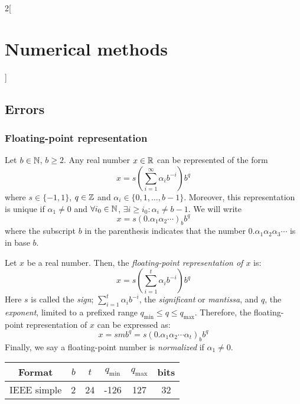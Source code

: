 \documentclass[../../../main.tex]{subfiles}
\begin{document}
\begin{multicols}{2}[\section{Numerical methods}]
    \subsection{Errors}
    \subsubsection*{Floating-point representation}
    \begin{theorem}
        Let $b\in\mathbb{N}$, $b\geq 2$. Any real number $x\in\mathbb{R}$ can be represented of the form
        \begin{equation*}
            x=s\left(\sum_{i=1}^\infty\alpha_ib^{-i}\right)b^q
        \end{equation*} where $s\in\{-1,1\}$, $q\in\mathbb{Z}$ and $\alpha_i\in\{0,1,\ldots,b-1\}$. Moreover, this representation is unique if $\alpha_1\ne0$ and $\forall i_0\in\mathbb{N}$, $\exists i\geq i_0:\alpha_i\ne b-1$. We will write $$x=s(0.\alpha_1\alpha_2\cdots)_bb^q$$ where the subscript $b$ in the parenthesis indicates that the number $0.\alpha_1\alpha_2\alpha_3\cdots$ is in base $b$.
    \end{theorem}
    \begin{definition}
        Let $x$ be a real number. Then, the \textit{floating-point representation of $x$} is: $$x=s\left(\sum_{i=1}^t\alpha_ib^{-i}\right)b^q$$ Here $s$ is called the \textit{sign}; $\sum_{i=1}^t\alpha_ib^{-i}$, the \textit{significant} or \textit{mantissa}, and $q$, the \textit{exponent}, limited to a prefixed range $q_\text{min}\leq q\leq q_\text{max}$. Therefore, the floating-point representation of $x$ can be expressed as: $$x=smb^q=s(0.\alpha_1\alpha_2\cdots\alpha_t)_bb^q$$ Finally, we say a floating-point number is \textit{normalized} if $\alpha_1\ne0$.
    \end{definition}
    \begin{center}
        \begin{minipage}{\linewidth}
            \centering
            \begin{tabular}{c|ccccc}
                Format      & $b$ & $t$ & $q_\text{min}$ & $q_\text{max}$ & bits \\
                \hline\hline
                IEEE simple & 2   & 24  & -126           & 127            & 32   \\

\end{tabular}
\end{minipage}
\end{center}
\end{multicols}
\end{document}
